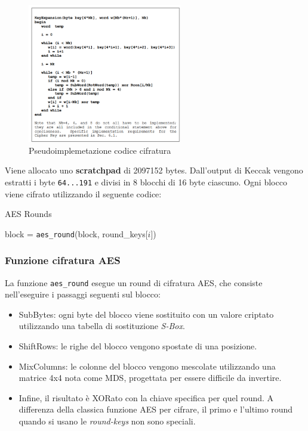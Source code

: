 \begin{figure}
  \centering
  \includegraphics[width = 0.60\textwidth]{image8.png}
  \caption{Pseudoimplemetazione codice cifratura}
\end{figure}
\newpage

Viene allocato uno \textbf{scratchpad} di 2097152 bytes.\cite{crypto_note_standard_cryptonight}
Dall'output di Keccak vengono estratti i byte \texttt{64...191} e divisi
in 8 blocchi di 16 byte ciascuno. Ogni blocco viene cifrato utilizzando
il seguente codice:

\begin{algorithm}
  \caption{AES Rounds}
  \begin{algorithmic}[1]
      \State block = \texttt{aes\_round}(block, round\_keys[$i$])
  \EndFor
  \end{algorithmic}
  \end{algorithm}


\subsubsection{Funzione cifratura AES}\label{funzione-cifratura-aes}

La funzione \texttt{aes\_round} esegue un round di cifratura AES, che
consiste nell'eseguire i passaggi seguenti sul blocco:

\begin{itemize}
\item
  SubBytes: ogni byte del blocco viene sostituito con un valore criptato
  utilizzando una tabella di sostituzione \emph{S-Box}.
\item
  ShiftRows: le righe del blocco vengono spostate di una posizione.
\item
  MixColumns: le colonne del blocco vengono mescolate utilizzando una
  matrice 4x4 nota come MDS, progettata per essere difficile
  da invertire.
\item
  Infine, il risultato è XORato con la chiave specifica per quel round.
  A differenza della classica funzione AES per cifrare, il primo e
  l'ultimo round quando si usano le \emph{round-keys} non sono speciali.
\end{itemize}

